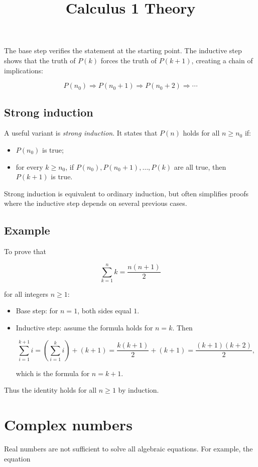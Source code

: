 \documentclass[11pt,a4paper]{article} \usepackage[T1]{fontenc}
\theoremstyle{plain} \newtheorem{theorem}{Theorem} \title{Calculus 1 Theory}
\begin{document}
The base step verifies the statement at the starting point. The inductive step
shows that the truth of $P(k)$ forces the truth of $P(k+1)$, creating a chain
of implications:

\[
P(n_0) \Rightarrow P(n_0+1) \Rightarrow P(n_0+2) \Rightarrow \cdots
\]

\subsection*{Strong induction}

A useful variant is \emph{strong induction}. It states that $P(n)$ holds for
all $n\ge n_0$ if:

\begin{itemize}
\item $P(n_0)$ is true;
\item for every $k\ge n_0$, if $P(n_0), P(n_0+1), \ldots, P(k)$ are all true,
then $P(k+1)$ is true.
\end{itemize}

Strong induction is equivalent to ordinary induction, but often simplifies
proofs where the inductive step depends on several previous cases.

\subsection*{Example}

To prove that

\[
\sum_{k=1}^{n} k = \frac{n(n+1)}{2}
\]

for all integers $n\ge 1$:

\begin{itemize}
\item Base step: for $n=1$, both sides equal $1$.
\item Inductive step: assume the formula holds for $n=k$. Then

\[
\sum_{i=1}^{k+1} i
= \left(\sum_{i=1}^{k} i\right) + (k+1)
= \frac{k(k+1)}{2} + (k+1)
= \frac{(k+1)(k+2)}{2},
\]

which is the formula for $n=k+1$.
\end{itemize}

Thus the identity holds for all $n\ge 1$ by induction.

\section{Complex numbers}

Real numbers are not sufficient to solve all algebraic equations. For example,
the equation
\end{document}
